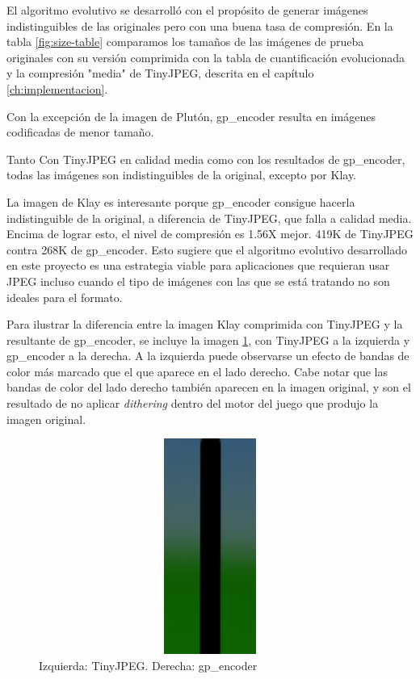 El algoritmo evolutivo se desarrolló con el propósito de generar imágenes
indistinguibles de las originales pero con una buena tasa de compresión. En la
tabla \ref{fig:size-table} comparamos los tamaños de las imágenes de prueba
originales con su versión comprimida con la tabla de cuantificación
evolucionada y la compresión "media" de TinyJPEG, descrita en el capítulo
\ref{ch:implementacion}.

Con la excepción de la imagen de Plutón, gp\_encoder resulta en imágenes codificadas de menor tamaño.

Tanto Con TinyJPEG en calidad media como con los resultados de gp\_encoder, todas las imágenes son indistinguibles de la original, excepto por Klay.

La imagen de Klay es interesante porque gp\_encoder consigue hacerla
indistinguible de la original, a diferencia de TinyJPEG, que falla a calidad
media. Encima de lograr esto, el nivel de compresión es 1.56X mejor. 419K de
TinyJPEG contra 268K de gp\_encoder. Esto sugiere que el algoritmo evolutivo
desarrollado en este proyecto es una estrategia viable para aplicaciones que
requieran usar JPEG incluso cuando el tipo de imágenes con las que se está
tratando no son ideales para el formato.

Para ilustrar la diferencia entre la imagen Klay comprimida con TinyJPEG y la
resultante de gp\_encoder, se incluye la imagen \ref{img:banding}, con TinyJPEG
a la izquierda y gp\_encoder a la derecha. A la izquierda puede observarse un
efecto de bandas de color más marcado que el que aparece en el lado derecho.
Cabe notar que las bandas de color del lado derecho también aparecen en la
imagen original, y son el resultado de no aplicar \emph{dithering} dentro del
motor del juego que produjo la imagen original.

\begin{figure}
    \includegraphics[width=400pt, height=200pt]{banding}
    \caption{Izquierda: TinyJPEG. Derecha: gp\_encoder}
    \label{img:banding}
\end{figure}

